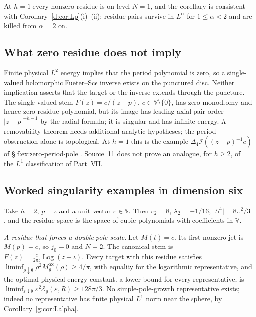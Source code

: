 \documentclass[11pt,a4paper]{article}
\numberwithin{equation}{section}
\theoremstyle{definition}
\theoremstyle{remark}
\theoremstyle{plain}
\newcommand{\lap}{\Delta_4}
\newcommand{\I}{\mathcal I}
\newcommand{\Max}{M^{\mathrm{ax}}}                    %
\newcommand{\Eg}{\mathcal E_{g}}
\newcommand{\abs}[1]{\lvert #1\rvert}
\newcommand{\VV}{\mathbb V}                       %
\begin{document}
At $h=1$ every nonzero residue is on level $N=1$, and the corollary is
consistent with Corollary~\ref{d:cor:Lp}(i)--(ii): residue pairs survive in
$L^\alpha$ for $1\le\alpha<2$ and are killed from $\alpha=2$ on.

\subsection{What zero residue does not imply}
\label{g:sub:zero-residue}

Finite physical $L^2$ energy implies that the period polynomial is zero, so a
single-valued holomorphic Fueter--Sce inverse exists on the punctured disc.
Neither implication asserts that the target or the inverse extends through the
puncture. The single-valued stem $F(z)=c/(z-p)$, $c\in\VV\setminus\{0\}$, has
zero monodromy and hence zero residue polynomial, but its image has leading
axial-pair order $\abs{z-p}^{-h-1}$ by the radial formula; it is singular and
has infinite energy. A removability theorem needs additional analytic
hypotheses; the period obstruction alone is topological. At $h=1$ this is the
example $\lap\I((z-p)^{-1}c)$ of \S\ref{f:ex:zero-period-pole}. Source~11 does
not prove an analogue, for $h\ge2$, of the $L^1$ classification of Part~VII.

\subsection{Worked singularity examples in dimension six}
\label{g:sub:examples}

Take $h=2$, $p=\iota$ and a unit vector $c\in\VV$. Then $c_2=8$,
$\lambda_2=-1/16$, $\abs{S^4}=8\pi^2/3$, and the residue space is the space of
cubic polynomials with coefficients in $\VV$.

\emph{A residue that forces a double-pole scale.} Let $M(t)=c$. Its first
nonzero jet is $M(p)=c$, so $j_0=0$ and $N=2$. The canonical stem is
$F(z)=\frac{c}{2\pi\iota}\operatorname{Log}(z-\iota)$. Every target with this
residue satisfies $\liminf_{\rho\downarrow0}\rho^2\Max_g(\rho)\ge4/\pi$, with
equality for the logarithmic representative, and the optimal physical energy
constant, a lower bound for every representative, is
$\liminf_{\varepsilon\downarrow0}\varepsilon^2\Eg(\varepsilon,R)\ge128\pi/3$.
No simple-pole-growth representative exists; indeed no representative has
finite physical $L^1$ norm near the sphere, by Corollary~\ref{g:cor:Lalpha}.
\end{document}
